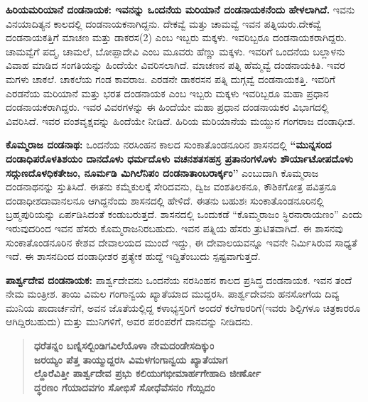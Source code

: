 \textbf{ಹಿರಿಯಮರಿಯಾನೆ ದಂಡನಾಯಕ: ಇವನನ್ನು ಒಂದನೆಯ ಮರಿಯಾನೆ ದಂಡನಾಯಕನೆಂದು ಹೇಳಲಾಗಿದೆ. }ಇವನು ವಿನಯಾದಿತ್ಯನ ಕಾಲದಲ್ಲಿ ದಂಡನಾಯಕನಾಗಿದ್ದನು. ದೇಕವ್ವೆ ಮತ್ತು ಚಾಮವ್ವೆ ಇವನ ಪತ್ನಿಯರು.\break ದೇಕವ್ವೆ ದಂಡನಾಯಕತ್ತಿಗೆ ಮಾಚಣ ಮತ್ತು ಡಾಕರಸ(2) ಎಂಬ ಇಬ್ಬರು ಮಕ್ಕಳು. ಇವರಿಬ್ಬರೂ ದಂಡನಾಯಕರಾಗಿದ್ದರು. ಚಾಮವ್ವೆಗೆ ಪದ್ಮ, ಚಾಮಲೆ, ಬೋಪ್ಪಾದೇವಿ ಎಂಬ ಮೂವರು ಹೆಣ್ಣು ಮಕ್ಕಳು. ಇವರಿಗೆ ಒಂದನೆಯ ಬಲ್ಲಾಳನು ವಿವಾಹ ಮಾಡಿದ ಸಂಗತಿಯನ್ನು ಹಿಂದೆಯೇ ವಿವರಿಸಲಾಗಿದೆ. ಮಾಚಣನ ಪತ್ನಿ ಹೆಮ್ಮವ್ವೆ ದಂಡನಾಯಕಿತಿ. ಇವರ ಮಗಳು ಚಾಕಲೆ. ಚಾಕಲೆಯ ಗಂಡ ಕಾವರಾಜ. ಎರಡನೇ ಡಾಕರಸನ ಪತ್ನಿ ದುಗ್ಗವ್ವೆ ದಂಡನಾಯಕತ್ತಿ. ಇವರಿಗೆ ಎರಡನೆಯ ಮರಿಯಾನೆ ಮತ್ತು ಭರತ ದಂಡನಾಯಕ ಎಂಬ ಇಬ್ಬರು ಮಕ್ಕಳು ಇವರಿಬ್ಬರೂ ಮಹಾ ಪ್ರಧಾನ ದಂಡನಾಯಕರಾಗಿದ್ದರು. ಇವರ ವಿವರಗಳನ್ನು ಈ ಹಿಂದೆಯೇ ಮಹಾ ಪ್ರಧಾನ ದಂಡನಾಯಕರ ವಿಭಾಗದಲ್ಲಿ ವಿವರಿಸಿದೆ. ಇವರ ವಂಶವೃಕ್ಷವನ್ನು ಹಿಂದೆಯೇ ನೀಡಿದೆ. ಹಿರಿಯ ಮರಿಯಾನೆಯ ಮಯ್ದುನ ಗಂಗರಾಜ ದಂಡಾಧೀಶ.

\textbf{ಕೊಮ್ಮರಾಜ ದಂಡನಾಥ:} ಒಂದನೆಯ ನರಸಿಂಹನ ಕಾಲದ ಸುಂಕಾತೊಂಡನೂರಿನ ಶಾಸನದಲ್ಲಿ \textbf{“ಮುನ್ನಸಂದ\general{\break } ದಂಡಾಧಿಪರೊಳತಿಶಯಂ ದಾನದೊಳು ಧರ್ಮದೊಳು ವಚನಶತಸಹಸ್ರ ಪ್ರತಾನಂಗಳೊಳು ಶೌರ್ಯಾಟೋಪದೊಳು\general{\break } ಸದ್ಗುಣದೊಳಧಿಕತೇಜಂ, ನೂರ್ಮಡಿ ಮಿಗಿಲೆನಿಪಂ ದಂಡನಾತಾಂಬರಾರ್ಕ್ಕಂ” }ಎಂಬುದಾಗಿ ಕೊಮ್ಮರಾಜ ದಂಡನಾಥನನ್ನು ಸ್ತುತಿಸಿದೆ. ಈತನು ಕಮ್ಮೆಕುಲಕ್ಕೆ ಸೇರಿದವನು, ದ್ವಿಜ ವಂಶತಿಲಕನೂ, ಕೌಶಿಕಗೋತ್ರ ಪವಿತ್ರನೂ ದಂಡಾಧೀಶದಾವಾನಲನೂ ಆಗಿದ್ದನೆಂದು ಶಾಸನದಲ್ಲಿ ಹೇಳಿದೆ. ಈತನು ಬಹುಶಃ ಸುಂಕಾತೊಂಡನೂರಿನಲ್ಲಿ ಬ್ರಹ್ಮಪುರಿಯನ್ನು ಏರ್ಪಡಿಸಿದಂತೆ ಕಂಡುಬರುತ್ತದೆ. ಶಾಸನದಲ್ಲಿ ಒಂದುಕಡೆ “ಕೊಮ್ಮರಾಜಂ ಸ್ಥಿರನಾರಾಯಣಂ” ಎಂದು ಇರುವುದರಿಂದ ಇವನ ಹೆಸರು ಕೊಮ್ಮರಾಜನಿರಬಹುದು. ಇವನ ಪತ್ನಿಯ ಹೆಸರು ತ್ರುಟಿತವಾಗಿದೆ. ಈ ಶಾಸನವು ಸುಂಕಾತೊಂಡನೂರಿನ ಕೇಶವ ದೇವಾಲಯದ ಮುಂದೆ ಇದ್ದು, ಈ ದೇವಾಲಯವನ್ನೂ ಇವನೇ ನಿರ್ಮಿಸಿರುವ ಸಾಧ್ಯತೆ ಇದೆ. ಈ ಶಾಸನದಿಂದ ದಂಡಾಧೀಶರ ಪ್ರತ್ಯೇಕ ಹುದ್ದೆ ಇದ್ದಿತೆಂಬುದು ಸ್ಪಷ್ಟವಾಗುತ್ತದೆ.

\textbf{ಪಾರ್ಶ್ವದೇವ ದಂಡನಾಯಕ:} ಪಾರ್ಶ್ವದೇವನು ಒಂದನೆಯ ನರಸಿಂಹನ ಕಾಲದ ಪ್ರಸಿದ್ಧ ದಂಡನಾಯಕ. ಇವನ ತಂದೆ ನೇಮ ಮಂತ್ರೀಶ. ತಾಯಿ ವಿಮಲ ಗಂಗಾನ್ವಯ ಖ್ಯಾತೆಯಾದ ಮುದ್ದರಸಿ. ಪಾರ್ಶ್ವದೇವನು ಹನಸೋಗೆಯ ದಿವ್ಯ ಮುನಿಯ ಪಾದಾರ್ಚನೆಗೆ, ಅವನ ಜೊತೆಯಲ್ಲಿದ್ದ ಕಳಾಭ್ಯಸ್ತರಿಗೆ ಅಂದರೆ ಕಲೆಗಾರರಿಗೆ(ಇವರು ಶಿಲ್ಪಿಗಳೂ ಚಿತ್ರಕಾರರೂ ಆಗಿದ್ದಿರಬಹುದು) ಮತ್ತು ಮುನಿಗಳಿಗೆ, ಅವರ ಪರಂಪರೆಗೆ ದಾನವನ್ನು ನೀಡಿದನು.

\begin{verse}
\textbf{ಧರೆತನ್ನಂ ಬಣ್ನಿಸಲ್ಬಿಂಡಿಗವಿಲೆಯೊಳಾ ನೇಮದಂಡೇಸದಿಕ್ಕುಂ} \\\textbf{ಜರಯ್ಯಂ ಪೆತ್ತ ತಾಯ್ಮುದ್ದರಸಿ ವಿಮಳಗಂಗಾನ್ವಯ ಖ್ಯಾತೆಯಾಗ} \\\textbf{ಲ್ದೊರೆವಿತ್ತೀ ಪಾರ್ಶ್ವದೇವ ಪ್ರಭು ಕಲಿಯುಗಭೀಮಾರ್ಹಗೇಹಾದಿ ಜೀರ್ಣೋ} \\\textbf{ದ್ಧರಣಂ ಗೆಯಾದವಗಂ ಸೋಭಿಸೆ ಸೋಧೆವೆಸನಂ ಗೆಯ್ಸಿದಂ}
\end{verse}

